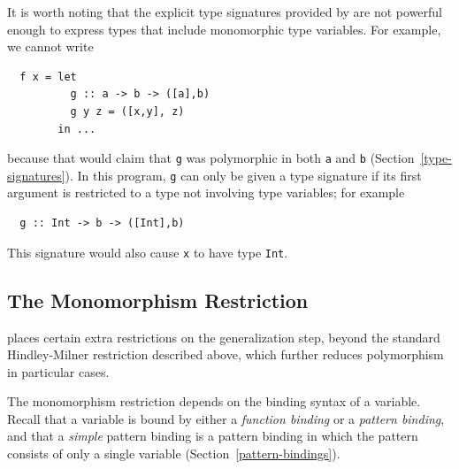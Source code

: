 It is worth noting that the explicit type signatures provided by \Haskell{}
are not powerful enough to express types that include monomorphic type
variables.  For example, we cannot write
\bprog
{\small\begin{verbatim}
  f x = let 
          g :: a -> b -> ([a],b)
          g y z = ([x,y], z)
        in ...
\end{verbatim}}
\eprog
because that would claim that \mbox{\tt g} was polymorphic in both \mbox{\tt a} and \mbox{\tt b}
(Section~\ref{type-signatures}).  In this program, \mbox{\tt g} can only be given
a type signature if its first argument is restricted to a type not involving
type variables; for example
\bprog
{\small\begin{verbatim}
  g :: Int -> b -> ([Int],b)
\end{verbatim}}
\eprog
This signature would also cause \mbox{\tt x} to have type \mbox{\tt Int}.

\subsection{The Monomorphism Restriction}
\label{sect:monomorphism-restriction}

\Haskell{} places certain extra restrictions on the generalization
step, beyond the standard Hindley-Milner restriction described above,
which further reduces polymorphism in particular cases.

The monomorphism restriction depends on the binding syntax of a
variable.  Recall that a variable is bound by either a {\em function
binding} or a {\em pattern binding}, and that a {\em simple} pattern
binding is a pattern binding in which the pattern consists of only a
single variable (Section~\ref{pattern-bindings}).

